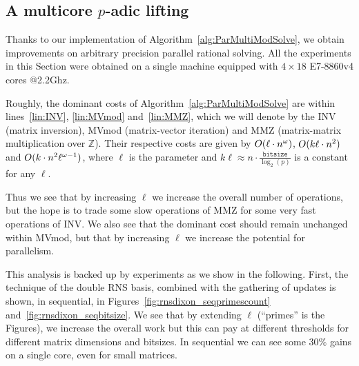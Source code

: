 \subsection{A multicore $p$-adic lifting}
Thanks to our implementation of Algorithm~\ref{alg:ParMultiModSolve},
we obtain improvements on arbitrary precision parallel rational
solving.
All the experiments in this Section were obtained on a single machine
equipped with $4{\times}18$ E7-8860v4 cores @2.2Ghz.


Roughly, the dominant costs of Algorithm~\ref{alg:ParMultiModSolve}
are within lines~\ref{lin:INV}, \ref{lin:MVmod} and~\ref{lin:MMZ},
which we will denote by the INV (matrix inversion), MVmod
(matrix-vector iteration) and MMZ (matrix-matrix multiplication over
$\mathbb{Z}$).
Their respective costs are given by $O(\ell\cdot{}n^\omega)$,
$O(k\ell\cdot{}n^2)$ and $O(k\cdot{}n^2\ell^{\omega-1})$,
where $\ell$ is the parameter and $k\ell\approx n \cdot
\frac{\texttt{bitsize}}{\log_2(p)}$ is a constant for any $\ell$.

Thus we see that by increasing $\ell$ we increase the overall number
of operations, but the hope is to trade some slow operations of MMZ
for some very fast operations of INV.
We also see that the dominant cost should remain unchanged within MVmod, but
that by increasing $\ell$ we increase the potential for
parallelism.

This analysis is backed up by experiments as we show in the following.
%
First, the technique of the double RNS basis, combined with the
gathering of updates is shown, in sequential, in
Figures~\ref{fig:rnsdixon_seqprimescount}
and~\ref{fig:rnsdixon_seqbitsize}. We see that by extending $\ell$
(``primes'' is the Figures), we increase the overall work but this
can pay at different thresholds for different matrix dimensions and
bitsizes. In sequential we can see some $30\%$ gains on a single core,
even for small matrices.


